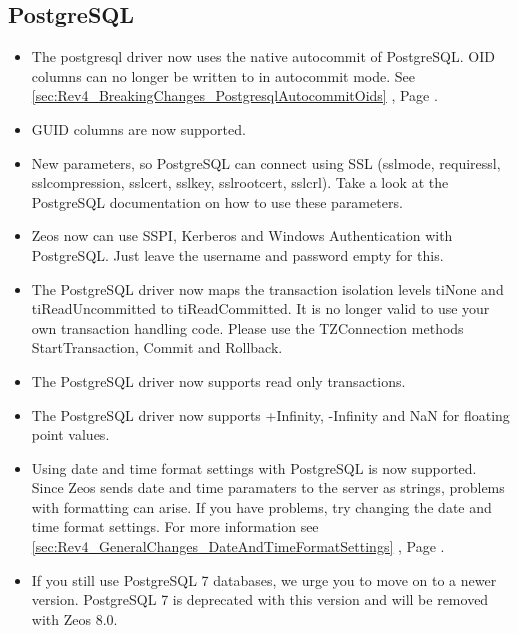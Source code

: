 \documentclass[a4paper,12pt,oneside]{book}
\begin{document}
\subsection{PostgreSQL}
\label{sec:Rev4_DriverSpecificChanges_Postgresql}
\begin{itemize}
\item 
  The postgresql driver now uses the native autocommit of PostgreSQL. 
	OID columns can no longer be written to in autocommit mode.
	See \ref{sec:Rev4_BreakingChanges_PostgresqlAutocommitOids} , Page \pageref{sec:Rev4_BreakingChanges_PostgresqlAutocommitOids}.
\item GUID columns are now supported.
\item 
  New parameters, so PostgreSQL can connect using SSL (sslmode, requiressl, sslcompression, sslcert, sslkey, sslrootcert, sslcrl). 
	Take a look at the PostgreSQL documentation on how to use these parameters.
\item
  Zeos now can use SSPI, Kerberos and Windows Authentication with PostgreSQL.
	Just leave the username and password empty for this.
\item
  The PostgreSQL driver now maps the transaction isolation levels tiNone and tiReadUncommitted to tiReadCommitted.
	It is no longer valid to use your own transaction handling code.
	Please use the TZConnection methods StartTransaction, Commit and Rollback.
\item
  The PostgreSQL driver now supports read only transactions.
\item
  The PostgreSQL driver now supports +Infinity, -Infinity and NaN for floating point values.
\item
  Using date and time format settings with PostgreSQL is now supported.
  Since Zeos sends date and time paramaters to the server as strings, problems with formatting can arise.
	If you have problems, try changing the date and time format settings.
	For more information see \ref{sec:Rev4_GeneralChanges_DateAndTimeFormatSettings} , Page \pageref{sec:Rev4_GeneralChanges_DateAndTimeFormatSettings}.
\item
  If you still use PostgreSQL 7 databases, we urge you to move on to a newer version.
	PostgreSQL 7 is deprecated with this version and will be removed with Zeos 8.0.
\end{itemize}
\end{document}
